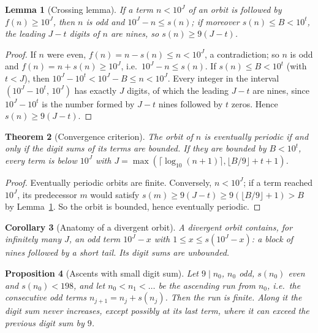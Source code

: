 \documentclass[11pt]{article}
\newtheorem{theorem}{Theorem}[section]
\newtheorem{lemma}[theorem]{Lemma}
\newtheorem{proposition}[theorem]{Proposition}
\newtheorem{corollary}[theorem]{Corollary}
\theoremstyle{definition}
\theoremstyle{remark}
\begin{document}
\begin{lemma}[Crossing lemma]\label{lem:cross}
If a term $n<10^J$ of an orbit is followed by $f(n)\ge10^J$, then $n$ is odd
and $10^J-n\le s(n)$; if moreover $s(n)\le B<10^t$, the leading $J-t$ digits
of $n$ are nines, so $s(n)\ge9(J-t)$.
\end{lemma}

\begin{proof}
If $n$ were even, $f(n)=n-s(n)\le n<10^J$, a contradiction; so $n$ is odd and
$f(n)=n+s(n)\ge10^J$, i.e.\ $10^J-n\le s(n)$. If $s(n)\le B<10^t$ (with
$t<J$), then $10^J-10^t<10^J-B\le n<10^J$. Every integer in the interval
$(10^J-10^t,\,10^J)$ has exactly $J$ digits, of which the leading $J-t$ are
nines, since $10^J-10^t$ is the number formed by $J-t$ nines followed by $t$
zeros. Hence $s(n)\ge9(J-t)$.
\end{proof}

\begin{theorem}[Convergence criterion]\label{thm:conv}
The orbit of $n$ is eventually periodic if and only if the digit sums of its
terms are bounded. If they are bounded by $B<10^t$, every term is below
$10^J$ with $J=\max(\lceil\log_{10}(n+1)\rceil,\lfloor B/9\rfloor+t+1)$.
\end{theorem}

\begin{proof}
Eventually periodic orbits are finite. Conversely, $n<10^J$; if a term
reached $10^J$, its predecessor $m$ would satisfy
$s(m)\ge9(J-t)\ge9(\lfloor B/9\rfloor+1)>B$ by Lemma~\ref{lem:cross}. So the
orbit is bounded, hence eventually periodic.
\end{proof}

\begin{corollary}[Anatomy of a divergent orbit]
A divergent orbit contains, for infinitely many $J$, an odd term $10^J-x$
with $1\le x\le s(10^J-x)$: a block of nines followed by a short tail. Its
digit sums are unbounded.
\end{corollary}

\begin{proposition}[Ascents with small digit sum]\label{prop:uprun}
Let $9\mid n_0$, $n_0$ odd, $s(n_0)$ even and $s(n_0)<198$, and let
$n_0<n_1<\dots$ be the ascending run from $n_0$, i.e.\ the consecutive odd
terms $n_{j+1}=n_j+s(n_j)$. Then the run is finite. Along it the digit sum
never increases, except possibly at its last term, where it can exceed the
previous digit sum by $9$.
\end{proposition}
\end{document}

